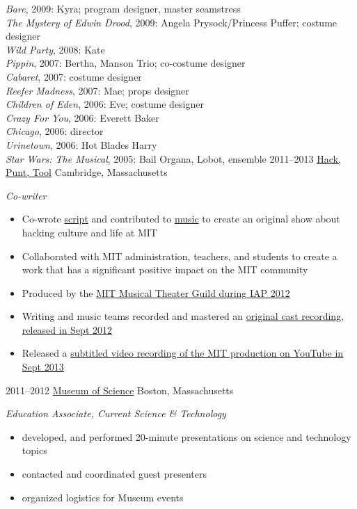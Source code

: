 \documentclass[]{friggeri-cv}
\begin{document}
\begin{entrylist}
{	\emph{Bare}, 2009: Kyra; program designer, master seamstress\\
	\emph{The Mystery of Edwin Drood}, 2009: Angela Prysock/Princess Puffer; costume designer\\
	\emph{Wild Party}, 2008: Kate\\
	\emph{Pippin}, 2007: Bertha, Manson Trio; co-costume designer\\
	\emph{Cabaret}, 2007: costume designer\\
	\emph{Reefer Madness}, 2007: Mae; props designer\\
	\emph{Children of Eden}, 2006: Eve; costume designer\\
	\emph{Crazy For You}, 2006: Everett Baker\\
	\emph{Chicago}, 2006: director\\
	\emph{Urinetown}, 2006: Hot Blades Harry\\
	\emph{Star Wars: The Musical}, 2005: Bail Organa, Lobot, ensemble
	}
  \entry
	{2011--2013}
	{\href{http://hackpunttool.com/}{Hack, Punt, Tool}}
	{Cambridge, Massachusetts}
	{\emph{Co-writer}
	\begin{itemize}
		\item Co-wrote \href{http://hackpunttool.files.wordpress.com/2012/03/hptfinalscript.pdf}{script} and contributed to \href{http://hackpunttool.files.wordpress.com/2012/03/hpt-pc-score-2-16-12.pdf}{music} to create an original show about hacking culture and life at MIT
		\item Collaborated with MIT administration, teachers, and students to create a work that has a significant positive impact on the MIT community
		\item Produced by the \href{http://web.mit.edu/mtg/www/2012/IAP/ProdStaff.html}{MIT Musical Theater Guild during IAP 2012}
		\item Writing and music teams recorded and mastered an \href{http://hackpunttool.bandcamp.com/}{original cast recording, released in Sept 2012}
		\item Released a \href{https://www.youtube.com/playlist?list=PLEUCiGVkvGkd9ZECCR2aLecWmMHvccJtI}{subtitled video recording of the MIT production on YouTube in Sept 2013}
	\end{itemize}
	}
  \entry
	{2011--2012}
	{\href{http://www.mos.org/}{Museum of Science}}
	{Boston, Massachusetts}
	{\emph{Education Associate, Current Science \& Technology}
	\begin{itemize}
		\item developed, and performed 20-minute presentations on science and technology topics
		\item contacted and coordinated guest presenters
		\item organized logistics for Museum events
	\end{itemize}
	}
	

\end{entrylist}
\end{document}
